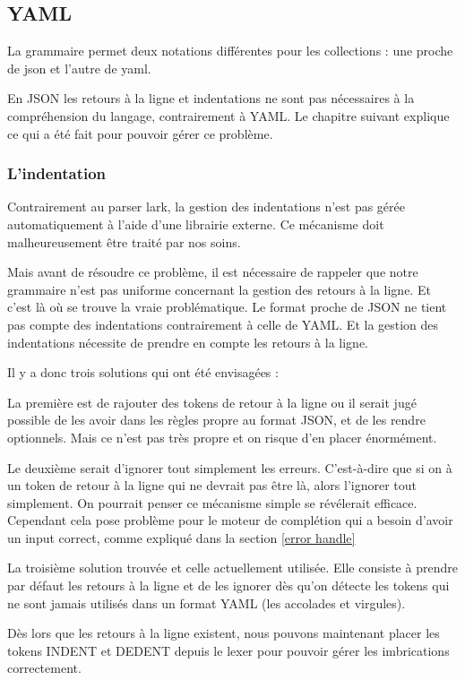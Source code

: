 \documentclass[
    iict, %
    il, %
]{heig-tb}
\begin{document}
\subsection{YAML}

La grammaire permet deux notations différentes pour les collections : une proche de json et l'autre de yaml.

En JSON les retours à la ligne et indentations ne sont pas nécessaires à la compréhension du langage, contrairement à YAML.
Le chapitre suivant explique ce qui a été fait pour pouvoir gérer ce problème.

\subsubsection{L'indentation}

Contrairement au parser lark, la gestion des indentations n'est pas gérée automatiquement à l'aide d'une librairie externe.
Ce mécanisme doit malheureusement être traité par nos soins.

Mais avant de résoudre ce problème, il est nécessaire de rappeler que notre grammaire n'est pas uniforme concernant la gestion des retours à la ligne.
Et c'est là où se trouve la vraie problématique.
Le format proche de JSON ne tient pas compte des indentations contrairement à celle de YAML.
Et la gestion des indentations nécessite de prendre en compte les retours à la ligne.

Il y a donc trois solutions qui ont été envisagées :

La première est de rajouter des tokens de retour à la ligne ou il serait jugé possible de les avoir dans les règles propre au format JSON, et de les rendre optionnels.
Mais ce n'est pas très propre et on risque d'en placer énormément.

Le deuxième serait d'ignorer tout simplement les erreurs.  C'est-à-dire que si on à un token de retour à la ligne qui ne devrait pas être là, alors l'ignorer tout simplement.
On pourrait penser ce mécanisme simple se révélerait efficace. Cependant cela pose problème pour le moteur de complétion qui a besoin d'avoir un input correct, comme expliqué dans la section \ref{error handle}

La troisième solution trouvée et celle actuellement utilisée. Elle consiste à prendre par défaut les retours à la ligne et de les ignorer dès qu'on détecte les tokens
qui ne sont jamais utilisés dans un format YAML (les accolades et virgules).

Dès lors que les retours à la ligne existent, nous pouvons maintenant placer les tokens INDENT et DEDENT depuis le lexer
pour pouvoir gérer les imbrications correctement.
\end{document}
